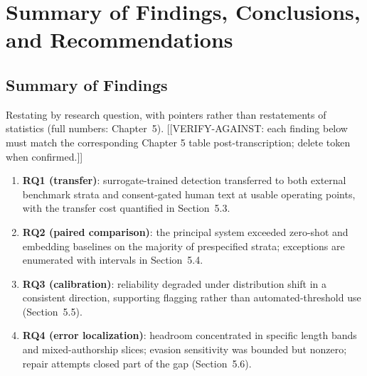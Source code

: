 
\chapter{Summary of Findings, Conclusions, and Recommendations}

\section{Summary of Findings}
Restating by research question, with pointers rather than restatements of
statistics (full numbers: Chapter~5). [[VERIFY-AGAINST: each finding below
must match the corresponding Chapter 5 table post-transcription; delete
token when confirmed.]]
\begin{enumerate}
\item \textbf{RQ1 (transfer)}: surrogate-trained detection transferred to
both external benchmark strata and consent-gated human text at usable
operating points, with the transfer cost quantified in
Section~5.3.
\item \textbf{RQ2 (paired comparison)}: the principal system exceeded
zero-shot and embedding baselines on the majority of prespecified strata;
exceptions are enumerated with intervals in Section~5.4.
\item \textbf{RQ3 (calibration)}: reliability degraded under distribution
shift in a consistent direction, supporting flagging rather than
automated-threshold use (Section~5.5).
\item \textbf{RQ4 (error localization)}: headroom concentrated in specific
length bands and mixed-authorship slices; evasion sensitivity was bounded
but nonzero; repair attempts closed part of the gap (Section~5.6).
\end{enumerate}

